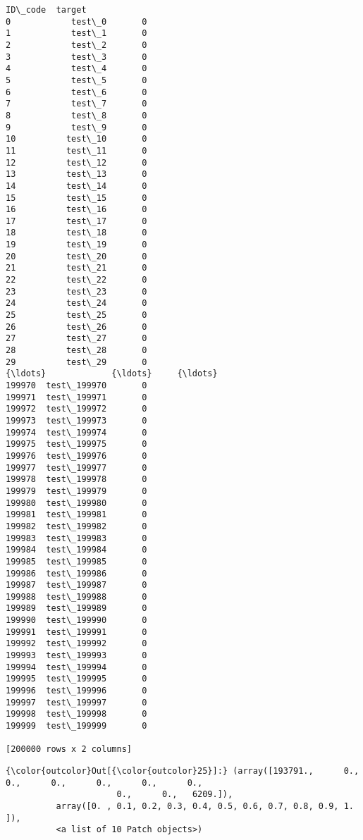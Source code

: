 \documentclass[11pt]{article}
\begin{document}
    \begin{Verbatim}[commandchars=\\\{\}]
            ID\_code  target
0            test\_0       0
1            test\_1       0
2            test\_2       0
3            test\_3       0
4            test\_4       0
5            test\_5       0
6            test\_6       0
7            test\_7       0
8            test\_8       0
9            test\_9       0
10          test\_10       0
11          test\_11       0
12          test\_12       0
13          test\_13       0
14          test\_14       0
15          test\_15       0
16          test\_16       0
17          test\_17       0
18          test\_18       0
19          test\_19       0
20          test\_20       0
21          test\_21       0
22          test\_22       0
23          test\_23       0
24          test\_24       0
25          test\_25       0
26          test\_26       0
27          test\_27       0
28          test\_28       0
29          test\_29       0
{\ldots}             {\ldots}     {\ldots}
199970  test\_199970       0
199971  test\_199971       0
199972  test\_199972       0
199973  test\_199973       0
199974  test\_199974       0
199975  test\_199975       0
199976  test\_199976       0
199977  test\_199977       0
199978  test\_199978       0
199979  test\_199979       0
199980  test\_199980       0
199981  test\_199981       0
199982  test\_199982       0
199983  test\_199983       0
199984  test\_199984       0
199985  test\_199985       0
199986  test\_199986       0
199987  test\_199987       0
199988  test\_199988       0
199989  test\_199989       0
199990  test\_199990       0
199991  test\_199991       0
199992  test\_199992       0
199993  test\_199993       0
199994  test\_199994       0
199995  test\_199995       0
199996  test\_199996       0
199997  test\_199997       0
199998  test\_199998       0
199999  test\_199999       0

[200000 rows x 2 columns]

    \end{Verbatim}

\begin{Verbatim}[commandchars=\\\{\}]
{\color{outcolor}Out[{\color{outcolor}25}]:} (array([193791.,      0.,      0.,      0.,      0.,      0.,      0.,
                      0.,      0.,   6209.]),
          array([0. , 0.1, 0.2, 0.3, 0.4, 0.5, 0.6, 0.7, 0.8, 0.9, 1. ]),
          <a list of 10 Patch objects>)
\end{Verbatim}
            
\end{document}
